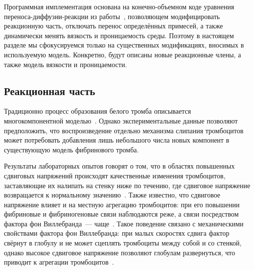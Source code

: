 Программная имплементация основана на конечно-объемном коде
уравнения переноса-диффузии-реакции из работы~\cite{vassilevski2020parallel},
позволяющем модифицировать реакционную часть,
отключать перенос определённых примесей,
а также динамически менять вязкость и проницаемость среды.
Поэтому в настоящем разделе мы сфокусируемся только на существенных модификациях,
вносимых в используемую модель.
Конкретно, будут описаны новые реакционные члены, а также модель вязкости и проницаемости.

\subsection{Реакционная часть}
\label{subsection:white_clot_model:reactions}

Традиционно процесс образования белого тромба описывается
многокомпонентной моделью~\cite{sorensen1999platelets_deposition_model, goodman2005thrombosis_model, taylor2016thrombosis_model, wu2017deposition_model}.
Однако экспериментальные данные позволяют предположить,
что воспроизведение отдельно механизма слипания тромбоцитов может потребовать добавления
лишь небольшого числа новых компонент в существующую модель фибринового тромба.

Результаты лабораторных опытов говорят о том,
что в областях повышенных сдвиговых напряжений происходят качественные изменения тромбоцитов,
заставляющие их налипать на стенку ниже по течению,
где сдвиговое напряжение возвращается к нормальному значению~\cite{rahman2019platelet_adhesion}.
Также известно, что сдвиговое напряжение влияет и на местную агрегацию тромбоцитов:
при его повышении фибриновые и фибриногеновые связи наблюдаются реже,
а связи посредством фактора фон Виллебранда~--- чаще~\cite{savage1996platelet_adhesion}.
Такое поведение связано с механическими свойствами фактора фон Виллебранда:
при малых скоростях сдвига фактор свёрнут в глобулу
и не может сцеплять тромбоциты между собой и со стенкой,
однако высокое сдвиговое напряжение позволяют глобулам развернуться,
что приводит к агрегации тромбоцитов~\cite{lippok2016vWF_unfolding, zhussupbekov2021vWF_unfolding}.

